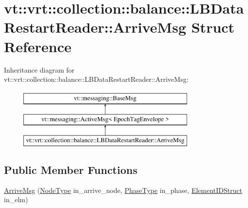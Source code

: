 \hypertarget{structvt_1_1vrt_1_1collection_1_1balance_1_1_l_b_data_restart_reader_1_1_arrive_msg}{}\section{vt\+:\+:vrt\+:\+:collection\+:\+:balance\+:\+:L\+B\+Data\+Restart\+Reader\+:\+:Arrive\+Msg Struct Reference}
\label{structvt_1_1vrt_1_1collection_1_1balance_1_1_l_b_data_restart_reader_1_1_arrive_msg}
Inheritance diagram for vt\+:\+:vrt\+:\+:collection\+:\+:balance\+:\+:L\+B\+Data\+Restart\+Reader\+:\+:Arrive\+Msg\+:\begin{figure}[H]
\begin{center}
\leavevmode
\includegraphics[height=3.000000cm]{structvt_1_1vrt_1_1collection_1_1balance_1_1_l_b_data_restart_reader_1_1_arrive_msg}
\end{center}
\end{figure}
\subsection*{Public Member Functions}
\begin{DoxyCompactItemize}
\item 
\hyperlink{structvt_1_1vrt_1_1collection_1_1balance_1_1_l_b_data_restart_reader_1_1_arrive_msg_ab83f336b46516e8d1c2915725c86ebc8}{Arrive\+Msg} (\hyperlink{namespacevt_a866da9d0efc19c0a1ce79e9e492f47e2}{Node\+Type} in\+\_\+arrive\+\_\+node, \hyperlink{namespacevt_a46ce6733d5cdbd735d561b7b4029f6d7}{Phase\+Type} in\+\_\+phase, \hyperlink{namespacevt_1_1vrt_1_1collection_1_1balance_a9f5b53fafb270212279a4757d2c4cd28}{Element\+I\+D\+Struct} in\+\_\+elm)
\end{DoxyCompactItemize}
